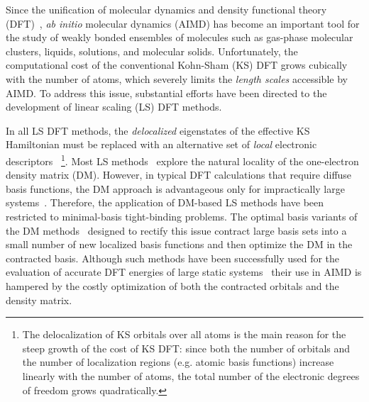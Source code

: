 \documentclass[aps,prl,reprint,amsmath,amssymb]{revtex4-1}
\newcommand*{\MAINTEXT}{}
\begin{document}
\fi

\maketitle

\ifdefined\MAINTEXT


Since the unification of molecular dynamics and density functional theory (DFT)~\cite{a:thecpmd},
\emph{ab initio} molecular dynamics (AIMD) has become an important tool for the study of weakly bonded ensembles of molecules such as gas-phase molecular clusters, liquids, solutions, and molecular solids. %
Unfortunately, the computational cost of the conventional Kohn-Sham (KS) DFT grows cubically with the number of atoms, which severely limits the \emph{length scales} accessible by AIMD. %
To address this issue, substantial efforts have been directed to the development of linear scaling (LS) DFT methods.

In all LS DFT methods, the \emph{delocalized} eigenstates of the effective KS Hamiltonian must be replaced with an alternative set of \emph{local} electronic descriptors
~\footnote{The delocalization of KS orbitals over all atoms is the main reason for the steep growth of the cost of KS DFT: since both the number of orbitals and the number of localization regions (e.g. atomic basis functions) increase linearly with the number of atoms, the total number of the electronic degrees of freedom grows quadratically.}. 
Most LS methods~\cite{a:linscale3,a:lee-yang-1996,a:ls-scuseria-1997,a:ls-manolopoulos-1998,a:ls-helgaker-2001,a:ls-niklasson-2003,a:curvy2,a:ls-dm-sign} explore the natural locality of the one-electron density matrix (DM). 
However, in typical DFT calculations that require diffuse basis functions, the DM approach is advantageous only for impractically large systems~\cite{a:ls-rev-1999,a:ls-dm-sign,a:almo-ls}.
Therefore, the application of DM-based LS methods have been restricted to minimal-basis tight-binding problems. 
The optimal basis variants of the DM methods~\cite{a:ls-stechel-1994,a:ls-gillan-1995,a:ls-gillan-1996,a:ls-onetep-2003, RZK-MAO} designed to rectify this issue contract large basis sets into a small number of new localized basis functions and then optimize the DM in the contracted basis. 
Although such methods have been successfully used for the evaluation of accurate DFT energies of large static systems~\cite{a:ls-onetep-2009,a:ls-conquest-2010,a:ls-onetep-2010-app1,a:ls-rev-2012} their use in AIMD is hampered by the costly optimization of both the contracted orbitals and the density matrix. 
\end{document}
